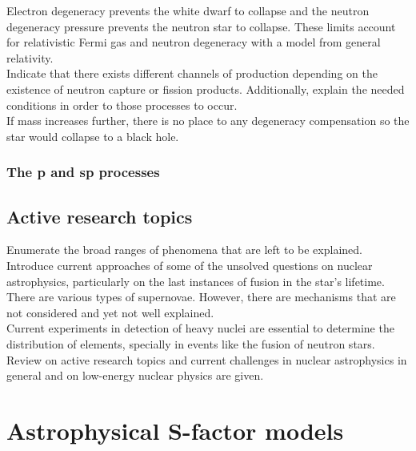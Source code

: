 \documentclass[openany]{book}
\begin{document}
Electron degeneracy prevents the white dwarf to collapse and the neutron degeneracy pressure prevents the neutron star to collapse. These limits account for relativistic Fermi gas and neutron degeneracy with a model from general relativity. \\

Indicate that there exists different channels of production depending on the existence of neutron capture or fission products. Additionally, explain the needed conditions in order to those processes to occur. \\ 

If mass increases further, there is no place to any degeneracy compensation so the star would collapse to a black hole.

\subsection{The p and sp processes} \label{sub:pProcesses}

\section{Active research topics} \label{sec:activeResearch}

Enumerate the broad ranges of phenomena that are left to be explained.  \\

Introduce current approaches of some of the unsolved questions on nuclear astrophysics, particularly on the last instances of fusion in the star's lifetime. \\

There are various types of  supernovae. However, there are mechanisms that are not considered and yet not well explained. \\

Current experiments in detection of heavy nuclei are essential to determine the distribution of elements, specially in events like the fusion of neutron stars.\\ 

Review on active research topics and current challenges in nuclear astrophysics in general \cite{arcones_bardayan_beers_bernstein_blackmon_messer_brown_brown_brune_champagne_et_2017} and on low-energy nuclear physics \cite{carlson_carpenter_casten_elster_fallon_gade_gross_hagen_hayes_higinbotham_et_2017} are given.



\chapter{Astrophysical S-factor models} \label{ch:sfactorModels}
\end{document}
